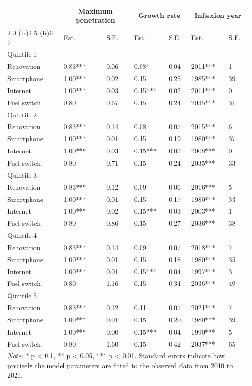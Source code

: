 \begin{tabular}{l{2cm}p{1cm}p{1cm}p{1cm}p{1cm}p{1cm}p{1cm}} \toprule
          & \multicolumn{2}{c}{Maximum penetration} & \multicolumn{2}{c}{Growth rate} & \multicolumn{2}{c}{Inflexion year} \\ 
          \cmidrule(lr){2-3} \cmidrule(lr){4-5} \cmidrule(lr){6-7}
          & Est. & S.E. & Est. & S.E. & Est. & S.E. \\ 
          \midrule 
 Quintile 1& & & & & & \\ \midrule
Renovation & 0.83*** & 0.06 & 0.08* & 0.04 & 2011*** & 1 \\
Smartphone & 1.00*** & 0.02 & 0.15 & 0.25 & 1985*** & 39 \\
Internet & 1.00*** & 0.03 & 0.15*** & 0.02 & 2011*** & 0 \\
Fuel switch & 0.80 & 0.67 & 0.15 & 0.24 & 2035*** & 31 \\\midrule 
Quintile 2& & & & & & \\ \midrule
Renovation & 0.83*** & 0.14 & 0.08 & 0.07 & 2015*** & 6 \\
Smartphone & 1.00*** & 0.01 & 0.15 & 0.19 & 1980*** & 37 \\
Internet & 1.00*** & 0.03 & 0.15*** & 0.02 & 2008*** & 0 \\
Fuel switch & 0.80 & 0.71 & 0.15 & 0.24 & 2035*** & 33 \\\midrule 
Quintile 3& & & & & & \\ \midrule
Renovation & 0.83*** & 0.12 & 0.09 & 0.06 & 2016*** & 5 \\
Smartphone & 1.00*** & 0.01 & 0.15 & 0.17 & 1980*** & 33 \\
Internet & 1.00*** & 0.02 & 0.15*** & 0.03 & 2003*** & 1 \\
Fuel switch & 0.80 & 0.86 & 0.15 & 0.27 & 2036*** & 38 \\\midrule 
Quintile 4& & & & & & \\ \midrule
Renovation & 0.83*** & 0.14 & 0.09 & 0.07 & 2018*** & 7 \\
Smartphone & 1.00*** & 0.01 & 0.15 & 0.18 & 1980*** & 35 \\
Internet & 1.00*** & 0.01 & 0.15*** & 0.04 & 1997*** & 3 \\
Fuel switch & 0.80 & 1.16 & 0.15 & 0.34 & 2036*** & 49 \\\midrule 
Quintile 5& & & & & & \\ \midrule
Renovation & 0.83*** & 0.12 & 0.11 & 0.07 & 2021*** & 7 \\
Smartphone & 1.00*** & 0.01 & 0.15 & 0.20 & 1980*** & 39 \\
Internet & 1.00*** & 0.00 & 0.15*** & 0.04 & 1990*** & 5 \\
Fuel switch & 0.80 & 1.60 & 0.15 & 0.42 & 2037*** & 65 \\
          \bottomrule 
          \multicolumn{7}{p{10cm}}{\footnotesize \textit{Note:} * p < 0.1, ** p < 0.05, *** p < 0.01. Standard errors indicate how precisely the model parameters are fitted to the observed data from 2010 to 2021.}
          \end{tabular}